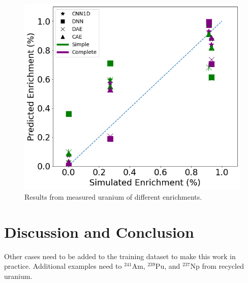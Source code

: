 \begin{figure}[H]
	\centering
	\includegraphics[width=0.8\linewidth]{images/measured_uranium.png}
	\caption{Results from measured uranium of different enrichments.}
	\label{fig:measured_uranium}
\end{figure}



\section{Discussion and Conclusion}

Other cases need to be added to the training dataset to make this work in practice. Additional examples need to $^{241}$Am, $^{239}$Pu, and $^{237}$Np from recycled uranium. 





